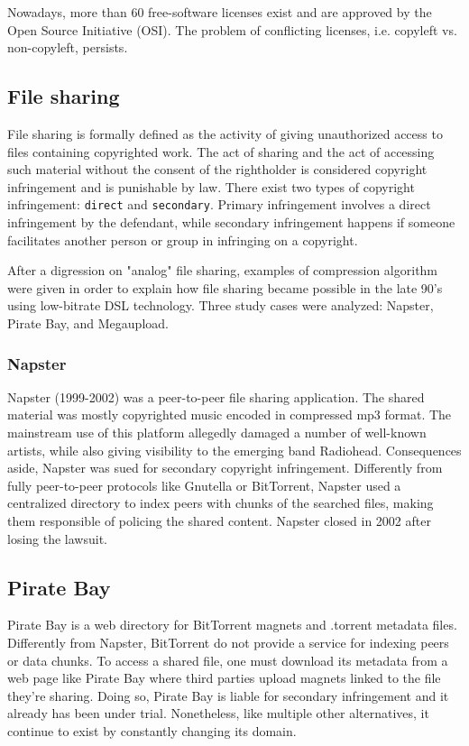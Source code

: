 Nowadays, more than 60 free-software licenses exist and are approved by the Open Source Initiative (OSI). The problem of conflicting licenses, i.e. copyleft vs. non-copyleft, persists.

\subsection*{File sharing}

File sharing is formally defined as the activity of giving unauthorized access to files containing copyrighted work. The act of sharing and the act of accessing such material without the consent of the rightholder is considered copyright infringement and is punishable by law. There exist two types of copyright infringement: \texttt{direct} and \texttt{secondary}. Primary infringement involves a direct infringement by the defendant, while secondary infringement happens if someone facilitates another person or group in infringing on a copyright.

After a digression on "analog" file sharing, examples of compression algorithm were given in order to explain how file sharing became possible in the late 90's using low-bitrate DSL technology. Three study cases were analyzed: Napster, Pirate Bay, and Megaupload.

\subsubsection*{Napster}

Napster (1999-2002) was a peer-to-peer file sharing application. The shared material was mostly copyrighted music encoded in compressed mp3 format. The mainstream use of this platform allegedly damaged a number of well-known artists, while also giving visibility to the emerging band Radiohead. Consequences aside, Napster was sued for secondary copyright infringement. Differently from fully peer-to-peer protocols like Gnutella or BitTorrent, Napster used a centralized directory to index peers with chunks of the searched files, making them responsible of policing the shared content. Napster closed in 2002 after losing the lawsuit. 

\subsection*{Pirate Bay}

Pirate Bay is a web directory for BitTorrent magnets and .torrent metadata files. Differently from Napster, BitTorrent do not provide a service for indexing peers or data chunks. To access a shared file, one must download its metadata from a web page like Pirate Bay where third parties upload magnets linked to the file they're sharing. Doing so, Pirate Bay is liable for secondary infringement and it already has been under trial. Nonetheless, like multiple other alternatives, it continue to exist by constantly changing its domain.

